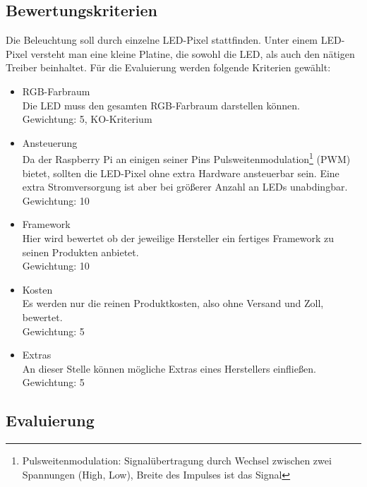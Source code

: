 
\subsection{Bewertungskriterien}
Die Beleuchtung soll durch einzelne LED-Pixel stattfinden. Unter einem LED-Pixel versteht man eine kleine Platine, die sowohl die LED, als auch den nätigen Treiber beinhaltet. Für die Evaluierung werden folgende Kriterien gewählt:
\begin{itemize}
\item RGB-Farbraum \\
Die LED muss den gesamten RGB-Farbraum darstellen können. \\
Gewichtung: 5, KO-Kriterium
\item Ansteuerung \\
Da der Raspberry Pi an einigen seiner Pins Pulsweitenmodulation\footnote{Pulsweitenmodulation: Signalübertragung durch Wechsel zwischen zwei Spannungen (High, Low), Breite des Impulses ist das Signal} (PWM) bietet, sollten die LED-Pixel ohne extra Hardware ansteuerbar sein. Eine extra Stromversorgung ist aber bei größerer Anzahl an LEDs unabdingbar. \\
Gewichtung: 10
\item Framework \\
Hier wird bewertet ob der jeweilige Hersteller ein fertiges Framework zu seinen Produkten anbietet. \\
Gewichtung: 10
\item Kosten \\
Es werden nur die reinen Produktkosten, also ohne Versand und Zoll, bewertet. \\
Gewichtung: 5
\item Extras \\
An dieser Stelle können mögliche Extras eines Herstellers einfließen. \\
Gewichtung: 5
\end{itemize}

\subsection{Evaluierung}\label{sub:evalurierung}

